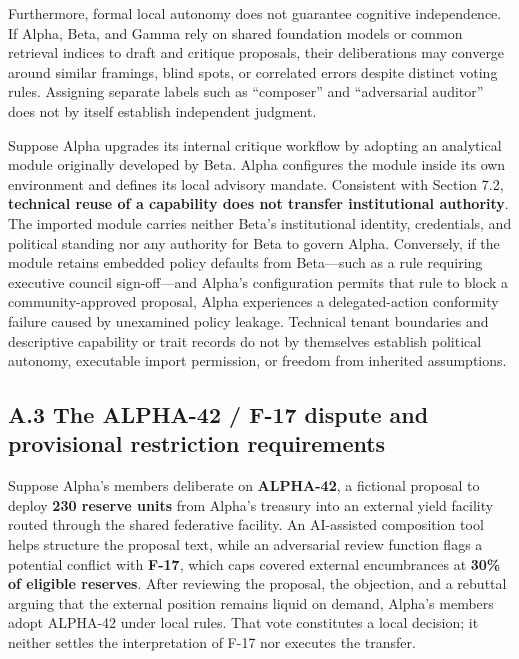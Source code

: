 \documentclass[
  10pt,
]{article}
\begin{document}
Furthermore, formal local autonomy does not guarantee cognitive
independence. If Alpha, Beta, and Gamma rely on shared foundation models
or common retrieval indices to draft and critique proposals, their
deliberations may converge around similar framings, blind spots, or
correlated errors despite distinct voting rules. Assigning separate
labels such as ``composer'' and ``adversarial auditor'' does not by
itself establish independent judgment.

Suppose Alpha upgrades its internal critique workflow by adopting an
analytical module originally developed by Beta. Alpha configures the
module inside its own environment and defines its local advisory
mandate. Consistent with Section 7.2, \textbf{technical reuse of a
capability does not transfer institutional authority}. The imported
module carries neither Beta's institutional identity, credentials, and
political standing nor any authority for Beta to govern Alpha.
Conversely, if the module retains embedded policy defaults from
Beta---such as a rule requiring executive council sign-off---and Alpha's
configuration permits that rule to block a community-approved proposal,
Alpha experiences a delegated-action conformity failure caused by
unexamined policy leakage. Technical tenant boundaries and descriptive
capability or trait records do not by themselves establish political
autonomy, executable import permission, or freedom from inherited
assumptions.

\subsection{A.3 The ALPHA-42 / F-17 dispute and provisional restriction
requirements}\label{a.3-the-alpha-42-f-17-dispute-and-provisional-restriction-requirements}

Suppose Alpha's members deliberate on \textbf{ALPHA-42}, a fictional
proposal to deploy \textbf{230 reserve units} from Alpha's treasury into
an external yield facility routed through the shared federative
facility. An AI-assisted composition tool helps structure the proposal
text, while an adversarial review function flags a potential conflict
with \textbf{F-17}, which caps covered external encumbrances at
\textbf{30\% of eligible reserves}. After reviewing the proposal, the
objection, and a rebuttal arguing that the external position remains
liquid on demand, Alpha's members adopt ALPHA-42 under local rules. That
vote constitutes a local decision; it neither settles the interpretation
of F-17 nor executes the transfer.
\end{document}
